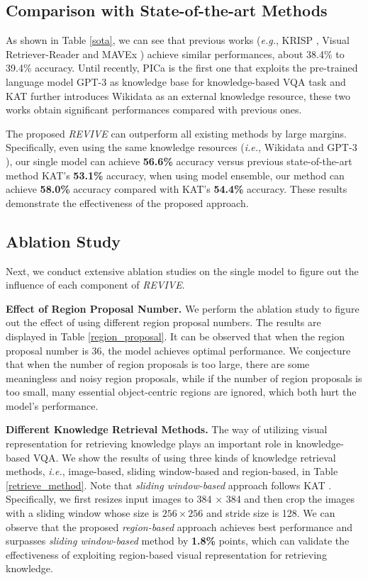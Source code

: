 \documentclass{article}
\begin{document}
\subsection{Comparison with State-of-the-art Methods}
\label{comparison}
As shown in Table \ref{sota}, we can see that previous works (\textit{e.g.}, KRISP \cite{marino2021krisp}, Visual Retriever-Reader \cite{luo2021weakly} and MAVEx \cite{wu2021multi}) achieve similar performances, about 38.4\% to 39.4\% accuracy. Until recently, PICa \cite{yang2021empirical} is the first one that exploits the pre-trained language model GPT-3 \cite{brown2020language} as knowledge base for knowledge-based VQA task and KAT \cite{gui2021kat} further introduces Wikidata \cite{vrandevcic2014wikidata} as an external knowledge resource, these two works obtain significant performances compared with previous ones.

The proposed \textit{REVIVE} can outperform all existing methods by large margins. Specifically, even using the same knowledge resources (\textit{i.e.}, Wikidata \cite{vrandevcic2014wikidata} and GPT-3 \cite{brown2020language}), our single model can achieve \textbf{56.6\%} accuracy versus previous state-of-the-art method KAT's \textbf{53.1\%} accuracy, when using model ensemble, our method can achieve \textbf{58.0\%} accuracy compared with KAT's \textbf{54.4\%} accuracy. These results demonstrate the effectiveness of the proposed approach.

\subsection{Ablation Study}
\label{ablation}
Next, we conduct extensive ablation studies on the single model to figure out the influence of each component of \textit{REVIVE}. 

\textbf{Effect of Region Proposal Number. } 
We perform the ablation study to figure out the effect of using different region proposal numbers. The results are displayed in Table \ref{region_proposal}. It can be observed that when the region proposal number is 36, the model achieves optimal performance. We conjecture that when the number of region proposals is too large, there are some meaningless and noisy region proposals, while if the number of region proposals is too small, many essential object-centric regions are ignored, which both hurt the model's performance.

\textbf{Different Knowledge Retrieval Methods. } The way of utilizing visual representation for retrieving knowledge plays an important role in knowledge-based VQA. We show the results of using three kinds of knowledge retrieval methods, \textit{i.e.}, image-based, sliding window-based and region-based, in Table \ref{retrieve_method}. Note that \textit{sliding window-based} approach follows KAT \cite{gui2021kat}. Specifically, we first resizes input images to 384 $\times$ 384 and then crop the images with a sliding window whose size is $256 \times 256$ and stride size is 128. We can observe that the proposed \textit{region-based} approach achieves best performance and surpasses \textit{sliding window-based} method by \textbf{1.8\%} points, which can validate the effectiveness of exploiting region-based visual representation for retrieving knowledge.
\end{document}
